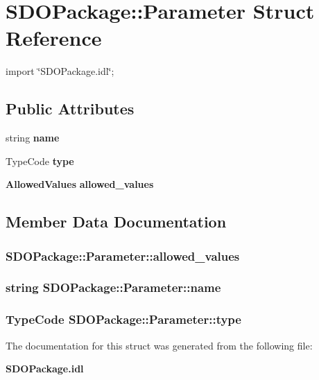 \section{SDOPackage::Parameter Struct Reference}
\label{structSDOPackage_1_1Parameter}


{\ttfamily import \char`\"{}SDOPackage.idl\char`\"{};}

\subsection*{Public Attributes}
\begin{DoxyCompactItemize}
\item 
string {\bf name}
\item 
TypeCode {\bf type}
\item 
{\bf AllowedValues} {\bf allowed\_\-values}
\end{DoxyCompactItemize}


\subsection{Member Data Documentation}
\subsubsection[{allowed\_\-values}]{ {\bf SDOPackage::Parameter::allowed\_\-values}}\label{structSDOPackage_1_1Parameter_a81cafbb66579be6e62740aa4d093b8be}
\subsubsection[{name}]{\setlength{\rightskip}{0pt plus 5cm}string {\bf SDOPackage::Parameter::name}}\label{structSDOPackage_1_1Parameter_a0da7260b28bd3569dad58dc7c5bba457}
\subsubsection[{type}]{\setlength{\rightskip}{0pt plus 5cm}TypeCode {\bf SDOPackage::Parameter::type}}\label{structSDOPackage_1_1Parameter_a013f778942e59807be89122000bb7f25}


The documentation for this struct was generated from the following file:\begin{DoxyCompactItemize}
\item 
{\bf SDOPackage.idl}\end{DoxyCompactItemize}
